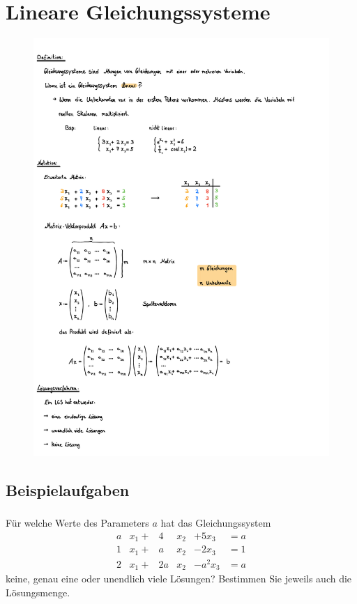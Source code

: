 \section{Lineare Gleichungssysteme}
\begin{figure}[h!]
    \includegraphics[page=1, scale=0.842]{pdf/01_Lineare_Gleichungssysteme.pdf}
\end{figure}
\newpage

            
\subsection{Beispielaufgaben}
\vspace{1cm}
\subsubsection{} %
Für welche Werte des Parameters $a$ hat das Gleichungssystem
\[\begin{aligned}
a&x_1 +& 4&x_2 &+ 5x_3 &= a\\
1&x_1 +& a&x_2 &- 2x_3 &= 1\\
2&x_1 +& 2a&x_2 &- a^2x_3 &= a
\end{aligned}\]
\noindent keine, genau eine oder unendlich viele Lösungen? Bestimmen Sie jeweils auch die Lösungsmenge.\\

